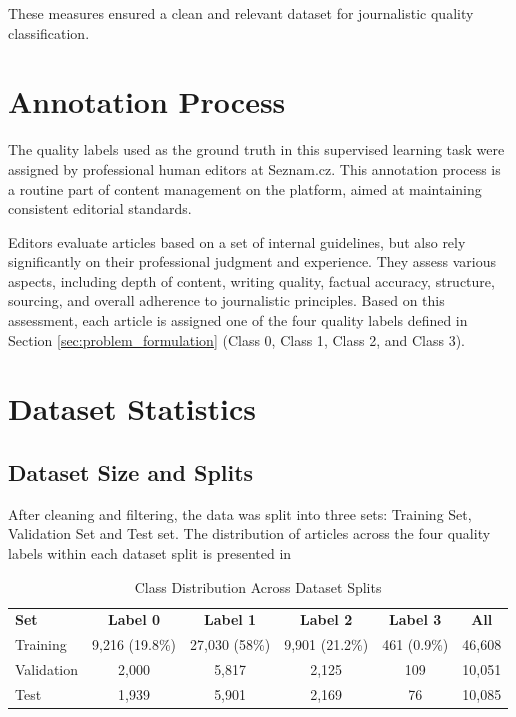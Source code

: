 These measures ensured a clean and relevant dataset for journalistic quality classification.

\section{Annotation Process}
The quality labels used as the ground truth in this supervised learning task were assigned by professional human editors at Seznam.cz. This annotation process is a routine part of content management on the platform, aimed at maintaining consistent editorial standards.

Editors evaluate articles based on a set of internal guidelines, but also rely significantly on their professional judgment and experience. They assess various aspects, including depth of content, writing quality, factual accuracy, structure, sourcing, and overall adherence to journalistic principles. Based on this assessment, each article is assigned one of the four quality labels defined in Section \ref{sec:problem_formulation} (\ac{Class 0}, \ac{Class 1}, \ac{Class 2}, and \ac{Class 3}).

\section{Dataset Statistics}\label{sec:dataset_statistics}
\subsection{Dataset Size and Splits}
After cleaning and filtering, the data was split into three sets: Training Set, Validation Set and Test set. The distribution of articles across the four quality labels within each dataset split is presented in 

\begin{table}[h]
  \centering
  \caption{Class Distribution Across Dataset Splits}
  \label{tab:class_distribution}
  \begin{tabular}{lccccc}
  \textbf{Set} & \textbf{Label 0} & \textbf{Label 1} & \textbf{Label 2} & \textbf{Label 3} & \textbf{All} \\
  Training & 9,216 (19.8\%) & 27,030 (58\%) & 9,901 (21.2\%) & 461 (0.9\%) & 46,608 \\
  Validation & 2,000 & 5,817 & 2,125 & 109 & 10,051 \\
  Test & 1,939 & 5,901 & 2,169 & 76 & 10,085 \\
  \end{tabular}
\end{table}

